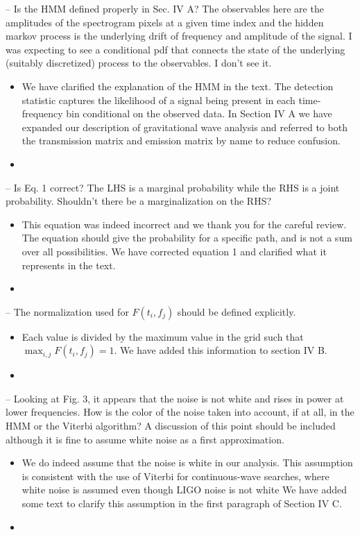 \documentclass{article}
\newcommand{\han}{\textcolor{orange}}
\begin{document}
\noindent
-- Is the HMM defined properly in Sec. IV A? The observables here are the amplitudes of the spectrogram pixels at a given time index and the hidden markov process is the underlying drift of frequency and amplitude of the signal. I was expecting to see a conditional pdf that connects the state of the underlying (suitably discretized) process to the observables. I don't see it.
\begin{itemize}
\item We have clarified the explanation of the HMM in the text. The detection statistic captures the likelihood of a signal being present in each time-frequency bin conditional on the observed data. In Section IV A we have expanded our description of gravitational wave analysis and referred to both the transmission matrix and emission matrix by name to reduce confusion.%
\item[]
\end{itemize}

\noindent
-- Is Eq. 1 correct? The LHS is a marginal probability while the RHS is a joint probability. Shouldn't there be a marginalization on the RHS?
\begin{itemize}
\item This equation was indeed incorrect and we thank you for the careful review. The equation should give the probability for a specific path, and is not a sum over all possibilities. We have corrected equation 1 and clarified what it represents in the text.
\item[]
\end{itemize}

\noindent
-- The normalization used for $F(t_i, f_j)$ should be defined explicitly. 
\begin{itemize}
\item Each value is divided by the maximum value in the grid such that $\max_{i,j} F(t_i, f_j) = 1$. We have added this information to section IV B.
\item[]
\end{itemize}

\noindent
-- Looking at Fig. 3, it appears that the noise is not white and rises in power at lower frequencies. How is the color of the noise taken into account, if at all, in the HMM or the Viterbi algorithm? A discussion of this point should be included although it is fine to assume white noise as a first approximation. 
\begin{itemize}
\item We do indeed assume that the noise is white in our analysis. This assumption is consistent with the use of Viterbi for continuous-wave searches, where white noise is assumed even though LIGO noise is not white%
We have added some text to clarify this assumption in the first paragraph of Section IV C.
\item[]
\end{itemize}
\end{document}
